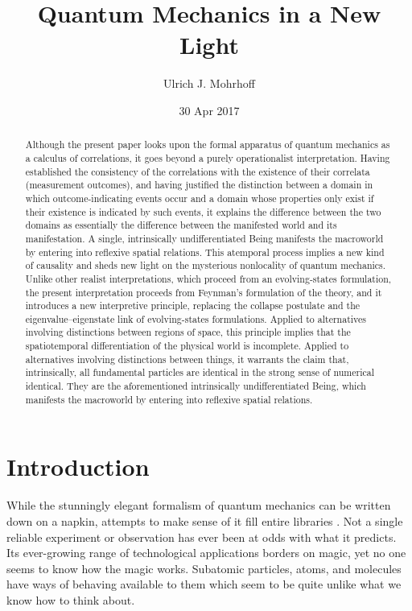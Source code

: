 \title{Quantum Mechanics in a New Light}
\author{Ulrich J. Mohrhoff}
\date{30 Apr 2017}
\maketitle
\begin{abstract}
Although the present paper looks upon the formal apparatus of quantum mechanics as a calculus of correlations, it goes beyond a purely operationalist interpretation. Having established the consistency of the correlations with the existence of their correlata (measurement outcomes), and having justified the distinction between a domain in which outcome-indicating events occur and a domain whose properties only exist if their existence is indicated by such events, it explains the difference between the two domains as essentially the difference between the manifested world and its manifestation. A single, intrinsically undifferentiated Being manifests the macroworld by entering into reflexive spatial relations. This atemporal process implies a new kind of causality and sheds new light on the mysterious nonlocality of quantum mechanics. Unlike other realist interpretations, which proceed from an evolving-states formulation, the present interpretation proceeds from Feynman's formulation of the theory, and it introduces a new interpretive principle, replacing the collapse postulate and the eigenvalue--eigenstate link of evolving-states formulations. Applied to alternatives involving distinctions between regions of space, this principle implies that the spatiotemporal differentiation of the physical world is incomplete. Applied to alternatives involving distinctions between things, it warrants the claim that, intrinsically, all fundamental particles are identical in the strong sense of numerical identical. They are the aforementioned intrinsically undifferentiated Being, which manifests the macroworld by entering into reflexive spatial relations.

\end{abstract}

\section{Introduction}\label{sec:intro}
While the stunningly elegant formalism of quantum mechanics can be written down on a napkin, attempts to make sense of it fill entire libraries \citep[p.~19]{Schlosshauer2011}. Not a single reliable experiment or observation has ever been at odds with what it predicts. Its ever-growing range of technological applications borders on magic, yet no one seems to know how the magic works. Subatomic particles, atoms, and molecules have ways of behaving available to them which seem to be quite unlike what we know how to think about.

